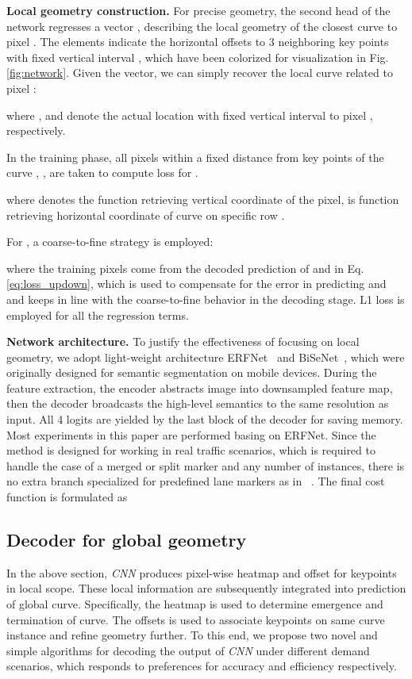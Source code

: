 \documentclass[final]{cvpr}
\begin{document}
\textbf{Local geometry construction.} For precise geometry, the second head of the network regresses a vector , describing the local geometry of the closest curve to pixel . The elements indicate the horizontal offsets to 3 neighboring key points with fixed vertical interval , which have been colorized for visualization in Fig.\ref{fig:network}. Given the vector, we can simply recover the local curve related to pixel :


\noindent where ,  and  denote the actual location with fixed vertical interval  to pixel , respectively.

In the training phase, all pixels within a fixed distance from key points of the curve , , are taken to compute loss for .



\noindent where  denotes the function retrieving vertical coordinate of the pixel,  is function retrieving horizontal coordinate of curve  on specific row .


For , a coarse-to-fine strategy is employed:



\noindent where the training pixels come from the decoded prediction of  and  in Eq.\ref{eq:loss_updown}, which is used to compensate for the error in predicting  and  and keeps in line with the coarse-to-fine behavior in the decoding stage. L1 loss is employed for all the regression terms.


\textbf{Network architecture.} To justify the effectiveness of focusing on local geometry, we adopt light-weight architecture ERFNet~\cite{romera2017erfnet} and BiSeNet~\cite{yu2018bisenet}, which were originally designed for semantic segmentation on mobile devices. During the feature extraction, the encoder abstracts image into downsampled feature map, then the decoder broadcasts the high-level semantics to the same resolution as input. All 4 logits are yielded by the last block of the decoder for saving memory. Most experiments in this paper are performed basing on ERFNet. Since the method is designed for working in real traffic scenarios, which is required to handle the case of a merged or split marker and any number of instances, there is no extra branch specialized for predefined lane markers as in ~\cite{pan2017spatial,hou2019learning}. The final cost function is formulated as


\thispagestyle{empty}
\subsection{Decoder for global geometry}
\label{subsection:decoder}
In the above section, \textit{CNN} produces pixel-wise
heatmap and offset for keypoints in local scope. These local information 
are subsequently integrated into prediction of
global curve. Specifically, the heatmap is used to determine
emergence and termination of curve. The offsets is used
to associate keypoints on same curve instance and refine
geometry further. To this end, we propose two novel and simple algorithms
for decoding the output of \textit{CNN} under different demand scenarios, which responds to
preferences for accuracy and efficiency respectively.
\end{document}
